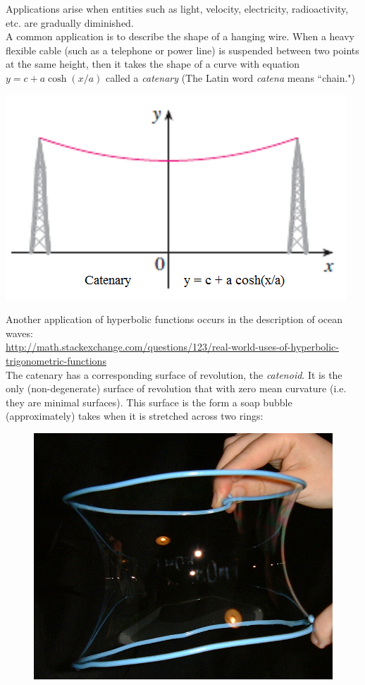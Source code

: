 
\begin{frame} 
Applications arise when entities such as light, velocity, electricity, radioactivity, etc. are gradually diminished.\\
A common application is to describe the shape of a hanging wire. When a heavy flexible cable (such as a telephone or power line) is suspended between two points at the same height, then it takes the shape of a curve with equation $ y=c+a\cosh(x/a) $ called a \textit{catenary}  (The Latin word \textit{catena} means ``chain.")\\
\begin{center}
\includegraphics[width=0.35\linewidth]{../../modules/hyperbolic-functions/pictures/catenary.PNG}
\end{center}
\end{frame}

\begin{frame} 
Another application of hyperbolic functions occurs in the description of ocean waves:\\
\url{http://math.stackexchange.com/questions/123/real-world-uses-of-hyperbolic-trigonometric-functions} \\
The catenary has a corresponding surface of revolution, the \textit{catenoid}. It is the only (non-degenerate) surface of revolution that with zero mean curvature (i.e. they are minimal surfaces). This surface is the form a soap bubble (approximately) takes when it is stretched across two rings:

\begin{figure}
\centering
\includegraphics[width=0.5\linewidth]{../../modules/hyperbolic-functions/pictures/catenoide.png}
\end{figure}

\end{frame}
